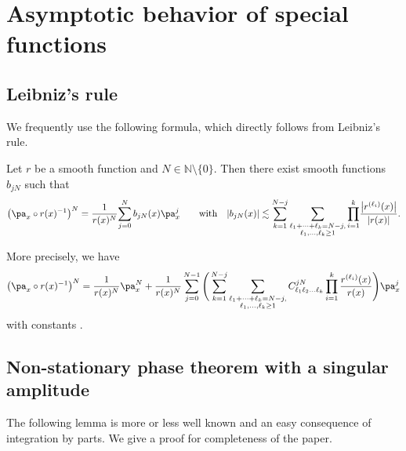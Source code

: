\section{Asymptotic behavior of special functions}

\subsection{Leibniz's rule}

We frequently use the following formula, which directly follows from Leibniz's rule.

\begin{Lemma}\label{Leibnizrule}
Let $r$ be a smooth function and $N\in\mathbb{N}\setminus\{0\}$. Then there exist smooth functions~$b_{jN}$ such that
\begin{gather*}
\bigl(\pa_x\circ r(x)^{-1}\bigr)^N=\frac{1}{r(x)^N}\!\sum_{j=0}^Nb_{jN}(x)\pa_{x}^j\qquad \text{with}\quad |b_{jN}(x)|\lesssim \sum_{k=1}^{N-j}\sum_{\substack{\ell_1+\cdots+\ell_k=N-j,\\ \ell_1,\hdots,\ell_k\geq 1}}\prod_{i=1}^k\!\frac{\big|r^{(\ell_i)}(x)\big|}{|r(x)|}.
\end{gather*}
\end{Lemma}

\begin{Remark}
More precisely, we have
\begin{align*}
\bigl(\pa_x\circ r(x)^{-1}\bigr)^N=\frac{1}{r(x)^N}\pa_x^N+\frac{1}{r(x)^N}\sum_{j=0}^{N-1}\Bigg(\sum_{k=1}^{N-j}\sum_{\substack{\ell_1+\cdots+\ell_k=N-j,\\ \ell_1,\hdots,\ell_k\geq 1}}C_{\ell_1\ell_2\hdots \ell_k}^{jN}\prod_{i=1}^{k}\frac{r^{(\ell_i)}(x)}{r(x)} \Bigg)\pa_{x}^j
\end{align*}
with constants .
\end{Remark}

\subsection{Non-stationary phase theorem with a singular amplitude}

The following lemma is more or less well known and an easy consequence of integration by parts. We give a proof for completeness of the paper.

